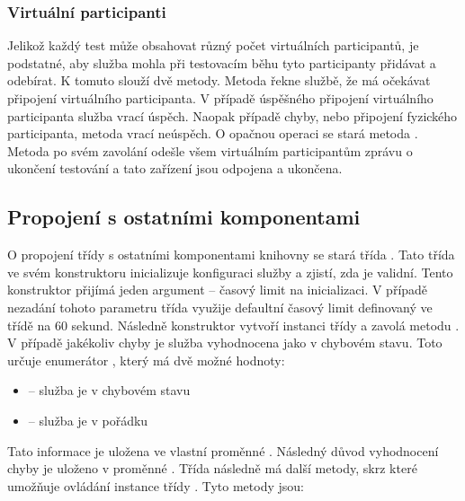 \subsubsection{Virtuální participanti}

Jelikož každý test může obsahovat různý počet virtuálních participantů, je podstatné, aby služba mohla při testovacím běhu tyto participanty přidávat a odebírat. K tomuto slouží dvě metody. Metoda  řekne službě, že má očekávat připojení virtuálního participanta. V případě úspěšného připojení virtuálního participanta služba vrací úspěch. Naopak případě chyby, nebo připojení fyzického participanta, metoda vrací neúspěch. O opačnou operaci se stará metoda . Metoda po svém zavolání odešle všem virtuálním participantům zprávu o ukončení testování a tato zařízení jsou odpojena a ukončena.

\subsection{Propojení s ostatními komponentami}

O propojení třídy  s ostatními komponentami knihovny se stará třída .
Tato třída ve svém konstruktoru inicializuje konfiguraci služby a zjistí, zda je validní. Tento konstruktor přijímá jeden argument -- časový limit na inicializaci. V případě nezadání tohoto parametru třída využije defaultní časový limit definovaný ve třídě na 60 sekund. Následně konstruktor vytvoří instanci třídy  a zavolá metodu . V případě jakékoliv chyby je služba vyhodnocena jako v chybovém stavu. Toto určuje enumerátor , který má dvě možné hodnoty: 

\begin{itemize}
    \item {} -- služba je v chybovém stavu
    \item {}  -- služba je v pořádku  
\end{itemize}

Tato informace je uložena ve vlastní proměnné . Následný důvod vyhodnocení chyby je uloženo v proměnné . Třída následně má další metody, skrz které umožňuje ovládání instance třídy . Tyto metody jsou:

